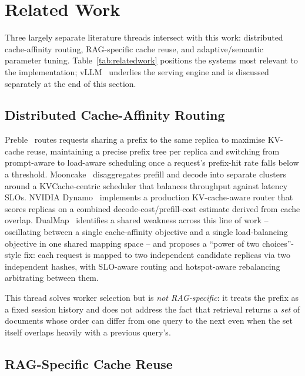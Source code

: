 \documentclass[conference]{IEEEtran}
\begin{document}
\section{Related Work}

Three largely separate literature threads intersect with this work:
distributed cache-affinity routing, RAG-specific cache reuse, and
adaptive/semantic parameter tuning. Table~\ref{tab:relatedwork}
positions the systems most relevant to the implementation;
vLLM~\cite{kwon2023vllm} underlies the serving engine and is discussed
separately at the end of this section.

\subsection{Distributed Cache-Affinity Routing}

Preble~\cite{preble2025} routes requests sharing a prefix to the same
replica to maximise KV-cache reuse, maintaining a precise prefix tree
per replica and switching from prompt-aware to load-aware scheduling
once a request's prefix-hit rate falls below a threshold.
Mooncake~\cite{mooncake2025} disaggregates prefill and decode into
separate clusters around a KVCache-centric scheduler that balances
throughput against latency SLOs. NVIDIA Dynamo~\cite{dynamo2025}
implements a production KV-cache-aware router that scores replicas on
a combined decode-cost/prefill-cost estimate derived from cache
overlap. DualMap~\cite{dualmap2026} identifies a shared weakness across
this line of work -- oscillating between a single cache-affinity
objective and a single load-balancing objective in one shared mapping
space -- and proposes a ``power of two choices''-style fix: each
request is mapped to two independent candidate replicas via two
independent hashes, with SLO-aware routing and hotspot-aware
rebalancing arbitrating between them.

This thread solves worker selection but is \emph{not RAG-specific}: it
treats the prefix as a fixed session history and does not address the
fact that retrieval returns a \emph{set} of documents whose order can
differ from one query to the next even when the set itself overlaps
heavily with a previous query's.

\subsection{RAG-Specific Cache Reuse}
\end{document}
